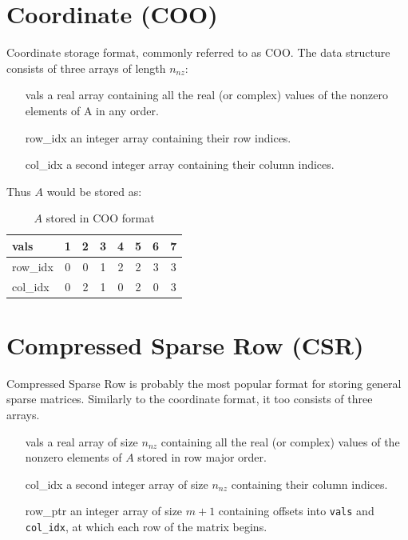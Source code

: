 \documentclass[thesis=M,english]{FITthesis}[2019/12/23]
\begin{document}
\section{Coordinate (COO)}

Coordinate storage format, commonly referred to as COO.
The data structure consists of three arrays of length $n_{nz}$\cite{saad03:IMS}:

\begin{enumerate}
    \itemsep=0em
    \item[vals] a real array containing all the real (or complex) values of the nonzero elements of A in any order.
    \item[row\_idx] an integer array containing their row indices.
    \item[col\_idx] a second integer array containing their column indices.
\end{enumerate}

Thus $A$ would be stored as:

\begin{table}[h!]
    \centering
    \begin{tabular}{ |l||c|c|c|c|c|c|c| }
        \hline
        vals     & 1 & 2 & 3 & 4 & 5 & 6 & 7 \\
        \hline
        row\_idx & 0 & 0 & 1 & 2 & 2 & 3 & 3 \\
        \hline
        col\_idx & 0 & 2 & 1 & 0 & 2 & 0 & 3 \\
        \hline
    \end{tabular}
    \caption{$A$ stored in COO format}
\end{table}


\section{Compressed Sparse Row (CSR)}

Compressed Sparse Row is probably the most popular format for storing general sparse matrices.
\cite{saad03:IMS} Similarly to the coordinate format, it too consists of three arrays.

\begin{enumerate}
    \itemsep=0em
    \item[vals] a real array of size $n_{nz}$ containing all the real (or complex) values of the nonzero elements of $A$
        stored in row major order.
    \item[col\_idx] a second integer array of size $n_{nz}$ containing their column indices.
    \item[row\_ptr] an integer array of size $m + 1$ containing offsets into \lstinline{vals} and
        \lstinline!col_idx!, at which each row of the matrix begins.
\end{enumerate}
\end{document}
